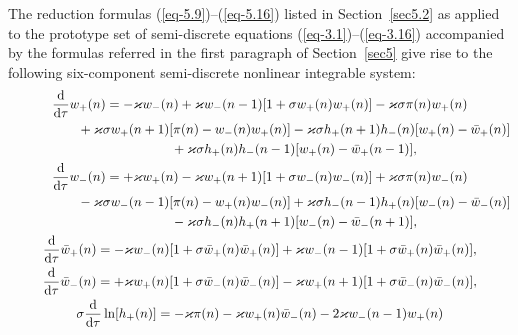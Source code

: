 \documentclass[pdftex]{sigma}
\numberwithin{equation}{section}
\begin{document}
The reduction formulas (\ref{eq-5.9})--(\ref{eq-5.16}) listed in Section~\ref{sec5.2} as applied to the prototype set of semi-discrete equations (\ref{eq-3.1})--(\ref{eq-3.16})
accompanied by the formulas referred in the first paragraph of Section~\ref{sec5} give rise to the following six-component semi-discrete nonlinear integrable system:
\begin{gather}
	 \frac{\mathrm{d}}{\mathrm{d}\tau}w_{+}(n) = -\varkappa w_{-}(n) + \varkappa w_{-}(n-1)[1+\sigma w_{+}(n)w_{+}(n)] - \varkappa\sigma\pi(n)w_{+}(n)\nonumber\\
\hspace{0.25mm}\hphantom{\frac{\mathrm{d}}{\mathrm{d}\tau}w_{+}(n) =}{}
	 +\varkappa\sigma w_{+}(n+1)[\pi(n)-w_{-}(n)w_{+}(n)] - \varkappa\sigma h_{+}(n+1)h_{-}(n)[w_{+}(n)-\bar{w}_{+}(n)]\nonumber\\
\hspace{0.25mm}\hphantom{\frac{\mathrm{d}}{\mathrm{d}\tau}w_{+}(n) =}{}
	 +\varkappa\sigma h_{+}(n)h_{-}(n-1)[w_{+}(n) - \bar{w}_{+}(n-1)],\label{eq-7.1}
\\
	 \frac{\mathrm{d}}{\mathrm{d}\tau}w_{-}(n) = + \varkappa w_{+}(n) - \varkappa w_{+}(n+1)[1+\sigma w_{-}(n)w_{-}(n)] + \varkappa\sigma\pi(n)w_{-}(n)\nonumber\\
\hspace{0.25mm}\hphantom{\frac{\mathrm{d}}{\mathrm{d}\tau}w_{-}(n) =}{}
	 -\varkappa\sigma w_{-}(n-1)[\pi(n)-w_{+}(n)w_{-}(n)] + \varkappa\sigma h_{-}(n-1)h_{+}(n)[w_{-}(n)-\bar{w}_{-}(n)]\nonumber\\
\hspace{0.25mm}\hphantom{\frac{\mathrm{d}}{\mathrm{d}\tau}w_{-}(n) =}{}
	 -\varkappa\sigma h_{-}(n)h_{+}(n+1)[w_{-}(n) -\bar{w}_{-}(n+1)], \label{eq-7.2}
\\
	 \frac{\mathrm{d}}{\mathrm{d}\tau}\bar{w}_{+}(n) = -\varkappa w_{-}(n)[1+\sigma \bar{w}_{+}(n)\bar{w}_{+}(n)] + \varkappa w_{-}(n-1)[1+\sigma \bar{w}_{+}(n)\bar{w}_{+}(n)], \label{eq-7.3}
\\
	 \frac{\mathrm{d}}{\mathrm{d}\tau}\bar{w}_{-}(n) = +\varkappa w_{+}(n)[1+\sigma \bar{w}_{-}(n)\bar{w}_{-}(n)] - \varkappa w_{+}(n+1)[1+\sigma \bar{w}_{-}(n)\bar{w}_{-}(n)], \label{eq-7.4}
\\
	 \sigma\frac{\mathrm{d}}{\mathrm{d}\tau}\ln[h_{+}(n)] = -\varkappa \pi(n) - \varkappa w_{+}(n)\bar{w}_{-}(n) - 2\varkappa w_{-}(n-1)w_{+}(n) \label{eq-7.5}\\
\hspace{0.25mm}\hphantom{\sigma\frac{\mathrm{d}}{\mathrm{d}\tau}\ln[h_{+}(n)] =}{}

\end{gather}
\end{document}
